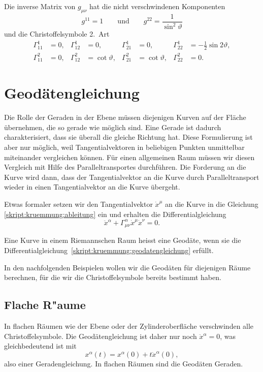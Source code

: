Die inverse Matrix von $g_{\mu\nu}$ hat die nicht verschwindenen
Komponenten
\[
g^{11} = 1
\qquad\text{und}\qquad
g^{22} = \frac1{\sin^2\vartheta}
\]
und die Christoffelsymbole 2.~Art
\begin{equation}
\begin{aligned}
 \Gamma_{11}^1
&=0,
&\Gamma_{12}^1
&=0,
&\Gamma_{21}^1
&=0,
&\Gamma_{22}^1
&=-\frac12\sin2\vartheta,
\\
 \Gamma_{11}^2
&=0,
&\Gamma_{12}^2
&=\cot\vartheta,
&\Gamma_{21}^2
&=\cot\vartheta,
&\Gamma_{22}^2
&=0.
\end{aligned}
\label{skript:kruemmung:christoffelkugel}
\end{equation}

\section{Geodätengleichung}
Die Rolle der Geraden in der Ebene müssen diejenigen Kurven auf der
Fläche übernehmen, die so gerade wie möglich sind. 
Eine Gerade ist dadurch charakterisiert, dass sie überall die gleiche
Richtung hat. 
Diese Formulierung ist aber nur möglich, weil Tangentialvektoren in
beliebigen Punkten unmittelbar miteinander vergleichen können.
Für einen allgemeinen Raum müssen wir diesen Vergleich mit Hilfe
des Paralleltransportes durchführen.
Die Forderung an die Kurve wird dann, dass der Tangentialvektor
an die Kurve durch Paralleltransport wieder in einen Tangentialvektor
an die Kurve übergeht.

Etwas formaler setzen wir den Tangentialvektor $\dot x^\mu$ an die
Kurve in die Gleichung \eqref{skript:kruemmung:ableitung} ein und
erhalten die Differentialgleichung 
\begin{equation}
\ddot x^\alpha+\Gamma_{\mu\nu}^\alpha \dot x^\mu\dot x^\nu=0.
\label{skript:kruemmung:geodatengleichung}
\end{equation}

\begin{definition}
Eine Kurve in einem Riemannschen Raum heisst eine Geodäte, wenn sie
die Differentialgleichung~\eqref{skript:kruemmung:geodatengleichung}
erfüllt.
\end{definition}

In den nachfolgenden Beispielen wollen wir die Geodäten für diejenigen
Räume berechnen, für die wir die Christoffelsymbole bereits bestimmt
haben.

%
%

\subsection{Flache R"aume}
In flachen Räumen wie der Ebene oder der Zylinderoberfläche verschwinden
alle Christoffelsymbole.
Die Geodätengleichung ist daher nur noch
$\ddot x^\alpha=0$, was gleichbedeutend ist mit
\[
x^\alpha(t)=x^\alpha(0) + t \dot x^\alpha(0),
\]
also einer Geradengleichung.
In flachen Räumen sind die Geodäten Geraden.

